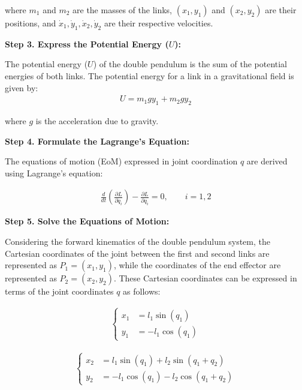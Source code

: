    where \(m_1\) and \(m_2\) are the masses of the links, \((x_1, y_1)\) and \((x_2, y_2)\) are their positions, and \(\dot{x}_1, \dot{y}_1, \dot{x}_2, \dot{y}_2\) are their respective velocities.

\textbf{Step 3. Express the Potential Energy (\(U\)):}

   The potential energy (\(U\)) of the double pendulum is the sum of the potential energies of both links. The potential energy for a link in a gravitational field is given by:
   \begin{align}
         \label{eq:potential energy}
         U = m_1 g y_1 + m_2 g y_2
   \end{align}

   where \(g\) is the acceleration due to gravity.
   
   
\textbf{Step 4. Formulate the Lagrange's Equation:}

  The equations of motion (EoM) expressed in joint coordination \(q\) are derived using Lagrange's equation:

    \begin{align}
        \label{eq:lagrange equation}
        \frac{d}{dt} \left( \frac{\partial L}{\partial \dot{q}_i} \right) - \frac{\partial L}{\partial q_i} = 0, \quad \quad i = 1, 2
    \end{align}


\textbf{Step 5. Solve the Equations of Motion:}

    Considering the forward kinematics of the double pendulum system, the Cartesian coordinates of the joint between the first and second links are represented as \(P_1=(x_1,y_1)\), while the coordinates of the end effector are represented as \(P_2=(x_2,y_2)\). These Cartesian coordinates can be expressed in terms of the joint coordinates \(q\) as follows:

    \begin{align}
        \label{eq:p1}
        \left\{
        \begin{aligned}
        x_1 &= l_1 \sin(q_1) \\
        y_1 &= - l_1 \cos(q_1)
        \end{aligned}
        \right.
    \end{align}

    \begin{align}
        \label{eq:p2}
        \left\{
        \begin{aligned}
        x_2 &= l_1 \sin(q_1) + l_2 \sin(q_1 + q_2) \\
        y_2 &= -l_1 \cos(q_1) - l_2 \cos(q_1 + q_2)
        \end{aligned}
        \right.
    \end{align}

